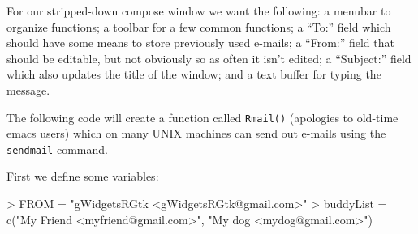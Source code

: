 \documentclass[12pt]{article}
\newcommand{\RCode}[1]{\texttt{#1}}
\newcommand{\RFunc}[1]{\texttt{#1()}}
\begin{document}
For our stripped-down compose window we want the following: a menubar
to organize functions; a toolbar for a few common functions; a ``To:''
field which should have some means to store previously used e-mails; a
``From:'' field that should be editable, but not obviously so as often
it isn't edited; a ``Subject:'' field which also updates the title of
the window; and a text buffer for typing the message.

The following code will create a function called \RFunc{Rmail}
(apologies to old-time emacs users) which on many UNIX machines can
send out e-mails using the \RCode{sendmail} command.

First we define some variables:
\begin{Schunk}
\begin{Sinput}
> FROM = "gWidgetsRGtk <gWidgetsRGtk@gmail.com>"
> buddyList = c("My Friend <myfriend@gmail.com>", "My dog <mydog@gmail.com>")
\end{Sinput}
\end{Schunk}
\end{document}
